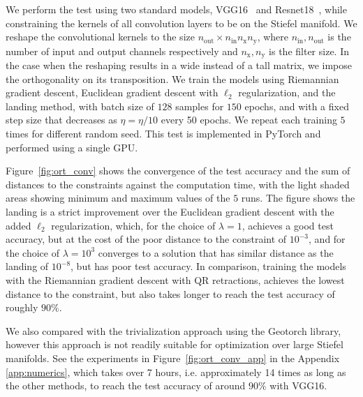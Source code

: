 \documentclass[twoside,11pt]{article}
\begin{document}
We perform the test using two standard models, VGG16~\citep{simonyan2014very} and Resnet18~\citep{he2016deep}, while constraining the kernels of all convolution layers to be on the Stiefel manifold. We reshape the convolutional kernels to the size $n_\mathrm{out} \times n_\mathrm{in} n_\mathrm{x} n_\mathrm{y}$, where $n_\mathrm{in}, n_\mathrm{out}$ is the number of input and output channels respectively and $n_\mathrm{x}, n_\mathrm{y}$ is the filter size. In the case when the reshaping results in a wide instead of a tall matrix, we impose the orthogonality on its transposition. We train the models using Riemannian gradient descent, Euclidean gradient descent with $\ell_2$ regularization, and the landing method, with batch size of $128$ samples for $150$ epochs, and with a fixed step size that decreases as $\eta = \eta/10$ every 50 epochs. We repeat each training $5$ times for different random seed. This test is implemented in PyTorch and performed using a single GPU. 

Figure~\ref{fig:ort_conv} shows the convergence of the test accuracy and the sum of distances to the constraints against the computation time, with the light shaded areas showing minimum and maximum values of the $5$ runs. %
The figure shows the landing is a strict improvement over the Euclidean gradient descent with the added $\ell_2$ regularization, which, for the choice of $\lambda = 1$, achieves a good test accuracy, but at the cost of the poor distance to the constraint of $10^{-3}$, and for the choice of $\lambda = 10^3$ converges to a solution that has similar distance as the landing of $10^{-8}$, but has poor test accuracy. In comparison, training the models with the Riemannian gradient descent with QR retractions, achieves the lowest distance to the constraint, but also takes longer to reach the test accuracy of roughly $90\%$.

We also compared with the trivialization approach \citep{lezcano2019trivializations} using the Geotorch library, however this approach is not readily suitable for optimization over large Stiefel manifolds. See the experiments in Figure~\ref{fig:ort_conv_app} in the Appendix \ref{app:numerics}, which takes over 7 hours, i.e. approximately 14 times as long as the other methods, to reach the test accuracy of around $90\%$ with VGG16.
%
%
%
%
\end{document}
